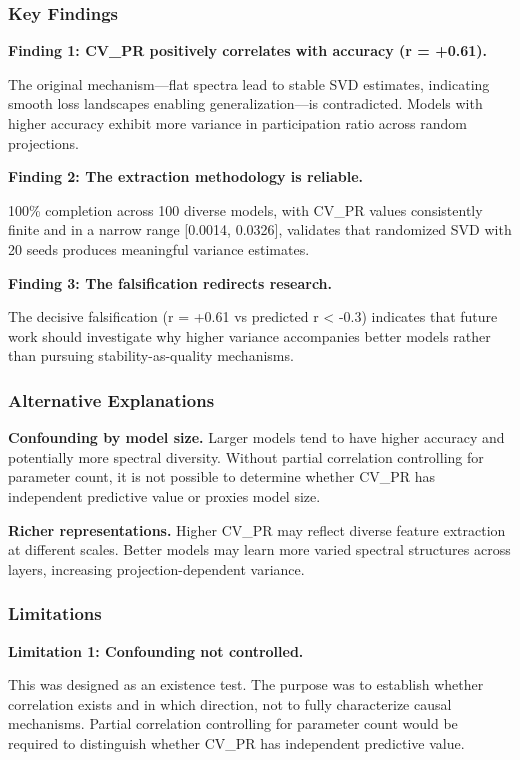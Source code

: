 
\subsubsection{Key Findings}

\textbf{Finding 1: CV\_PR positively correlates with accuracy (r = +0.61).}

The original mechanism---flat spectra lead to stable SVD estimates, indicating smooth loss landscapes enabling generalization---is contradicted. Models with higher accuracy exhibit more variance in participation ratio across random projections.

\textbf{Finding 2: The extraction methodology is reliable.}

100\% completion across 100 diverse models, with CV\_PR values consistently finite and in a narrow range [0.0014, 0.0326], validates that randomized SVD with 20 seeds produces meaningful variance estimates.

\textbf{Finding 3: The falsification redirects research.}

The decisive falsification (r = +0.61 vs predicted r < -0.3) indicates that future work should investigate why higher variance accompanies better models rather than pursuing stability-as-quality mechanisms.

\subsubsection{Alternative Explanations}

\textbf{Confounding by model size.} Larger models tend to have higher accuracy and potentially more spectral diversity. Without partial correlation controlling for parameter count, it is not possible to determine whether CV\_PR has independent predictive value or proxies model size.

\textbf{Richer representations.} Higher CV\_PR may reflect diverse feature extraction at different scales. Better models may learn more varied spectral structures across layers, increasing projection-dependent variance.

\subsubsection{Limitations}

\textbf{Limitation 1: Confounding not controlled.}

This was designed as an existence test. The purpose was to establish whether correlation exists and in which direction, not to fully characterize causal mechanisms. Partial correlation controlling for parameter count would be required to distinguish whether CV\_PR has independent predictive value.

